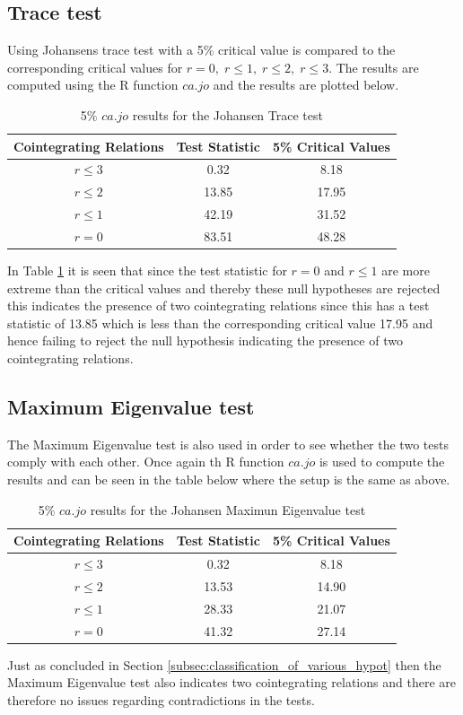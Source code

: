 \subsection{Trace test}\label{subsec:johansen_trace}
Using Johansens trace test with a 5\% critical value is compared to the corresponding critical values for $r=0,\;r\leq1,\;r\leq 2,\;r\leq3$.
The results are computed using the R function $ca.jo$ and the results are plotted below.
\begin{table}[h!]
\centering
\begin{tabular}{|c|c|c|}
\hline
\textbf{Cointegrating Relations} & \textbf{Test Statistic} & \textbf{5\% Critical Values} \\ \hline
$r \leq 3$ & 0.32  & 8.18  \\ \hline
$r \leq 2$ & 13.85 & 17.95 \\ \hline
$r \leq 1$ & 42.19 & 31.52 \\ \hline
$r = 0$    & 83.51 & 48.28 \\ \hline
\end{tabular}
\caption{5\% $ca.jo$ results for the Johansen Trace test}
\label{tab:traceresults}
\end{table}
In Table \ref{tab:traceresults} it is seen that since the test statistic for $r=0$ and $r\leq1$ are more extreme than the critical values and thereby these null hypotheses are rejected  this indicates the presence of two cointegrating relations since this has a test statistic of 13.85 which is less than the corresponding critical value 17.95 and hence failing to reject the null hypothesis indicating the presence of two cointegrating relations.

\subsection{Maximum Eigenvalue test}
The Maximum Eigenvalue test is also used in order to see whether the two tests comply with each other. Once again th R function $ca.jo$ is used to compute the results and can be seen in the table below where the setup is the same as above.
\begin{table}[h!]
\centering
\begin{tabular}{|c|c|c|}
\hline
\textbf{Cointegrating Relations} & \textbf{Test Statistic} & \textbf{5\% Critical Values} \\ \hline
$r \leq 3$ & 0.32  & 8.18  \\ \hline
$r \leq 2$ & 13.53 & 14.90 \\ \hline
$r \leq 1$ & 28.33 & 21.07 \\ \hline
$r = 0$    & 41.32 & 27.14 \\ \hline
\end{tabular}
\caption{5\% $ca.jo$ results for the Johansen Maximun Eigenvalue test}
\label{tab:maximal_eigenvalue}
\end{table}
Just as concluded in Section \ref{subsec:classification_of_various_hypot} then the Maximum Eigenvalue test also indicates two cointegrating relations and there are therefore no issues regarding contradictions in the tests.

